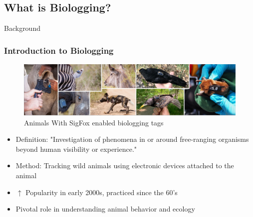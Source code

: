 \documentclass{beamer}
\begin{document}
\subsection{What is Biologging?}
\begin{frame}{Background}
  \frametitle{Introduction to Biologging}
        \begin{figure}[htbp]
          \centering
          \includegraphics[width=.9\textwidth, height=.25\textheight]{TrakingDevices.png}
          \caption{Animals With SigFox enabled biologging tags\cite{wild2023multi}}
          \label{fig:TaggedAnimals}
        \end{figure}
        \begin{itemize}
          \item Definition: "Investigation of phenomena in or around free-ranging organisms beyond human visibility or experience.\cite{boyd2004bio}"
          \item Method: Tracking wild animals using electronic devices attached to the animal
          \item $\uparrow$ Popularity in early 2000s, practiced since the 60's
          \item Pivotal role in understanding animal behavior and ecology
        \end{itemize}
\end{frame}
\end{document}
